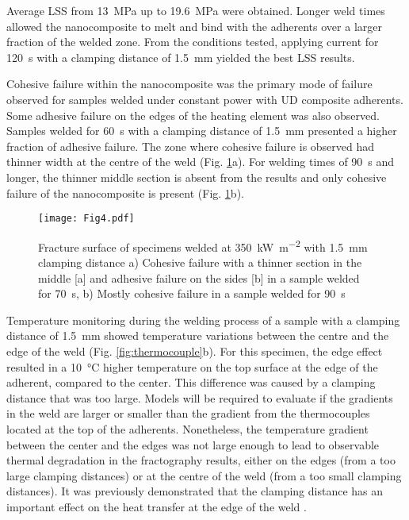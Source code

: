 \FloatBarrier
Average LSS from \SI{13}{\MPa} up to \SI{19.6}{\MPa} were obtained. 
Longer weld times allowed the nanocomposite to melt and bind with the adherents over a larger fraction of the welded zone. 
From the conditions tested, applying current for \SI{120}{\s} with a clamping distance of \SI{1.5}{\mm} yielded the best LSS results. 

Cohesive failure within the nanocomposite was the primary mode of failure observed for samples welded under constant power with UD composite adherents.
Some adhesive failure on the edges of the heating element was also observed. 
Samples welded for \SI{60}{\s} with a clamping distance of \SI{1.5}{\mm} presented a higher fraction of adhesive failure. 
The zone where cohesive failure is observed had thinner width at the centre of the weld (Fig. \ref{fig:fracture_surface}a). 
For welding times of \SI{90}{\s} and longer, the thinner middle section is absent from the results and only cohesive failure of the nanocomposite is present (Fig. \ref{fig:fracture_surface}b). 

\begin{figure}[h]
	\centering
	\texttt{[image: Fig4.pdf]}
	\caption{Fracture surface of specimens welded at \SI{350}{\kW\per\square\metre} with \SI{1.5}{\mm} clamping distance a) Cohesive failure with a thinner section in the middle [a] and adhesive failure on the sides [b] in a sample welded for \SI{70}{\s}, b) Mostly cohesive failure in a sample welded for \SI{90}{\s} \cite{Brassard2018_figshare_article1}}
	\label{fig:fracture_surface}
\end{figure}

\FloatBarrier
Temperature monitoring during the welding process of a sample with a clamping distance of \SI{1.5}{\mm} showed temperature variations between the centre and the edge of the weld (Fig. \ref{fig:thermocouple}b).
For this specimen, the edge effect resulted in a \SI{10}{\celsius} higher temperature on the top surface at the edge of the adherent, compared to the center. 
This difference was caused by a clamping distance that was too large. 
Models will be required to evaluate if the gradients in the weld are larger or smaller than the gradient from the thermocouples located at the top of the adherents. 
Nonetheless, the temperature gradient between the center and the edges was not large enough to lead to observable thermal degradation in the fractography results, either on the edges (from a too large clamping distances) or at the centre of the weld (from a too small clamping distances). 
It was previously demonstrated that the clamping distance has an important effect on the heat transfer at the edge of the weld \cite{Talbot2013}. 

